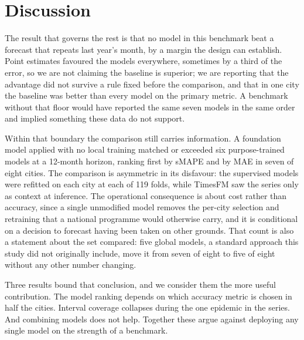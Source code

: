 \documentclass[11pt]{article}
\begin{document}

\section{Discussion}

The result that governs the rest is that no model in this benchmark beat a forecast that
repeats last year's month, by a margin the design can establish. Point estimates favoured
the models everywhere, sometimes by a third of the error, so we are not claiming the
baseline is superior; we are reporting that the advantage did not survive a rule fixed
before the comparison, and that in one city the baseline was better than every model on
the primary metric. A benchmark without that floor would have reported the same seven
models in the same order and implied something these data do not support.

Within that boundary the comparison still carries information. A foundation model applied
with no local training matched or exceeded six purpose-trained models at a 12-month
horizon, ranking first by sMAPE and by MAE in seven of eight cities. The comparison is
asymmetric in its disfavour: the supervised models were refitted on each city at each of
119 folds, while TimesFM saw the series only as context at inference. The operational
consequence is about cost rather than accuracy, since a single unmodified model removes
the per-city selection and retraining that a national programme would otherwise carry, and
it is conditional on a decision to forecast having been taken on other grounds. That count
is also a statement about the set compared: five global models, a standard approach this
study did not originally include, move it from seven of eight to five of eight without any
other number changing.

Three results bound that conclusion, and we consider them the more useful contribution.
The model ranking depends on which accuracy metric is chosen in half the cities. Interval
coverage collapses during the one epidemic in the series. And combining models does not
help. Together these argue against deploying any single model on the strength of a
benchmark.
\end{document}
